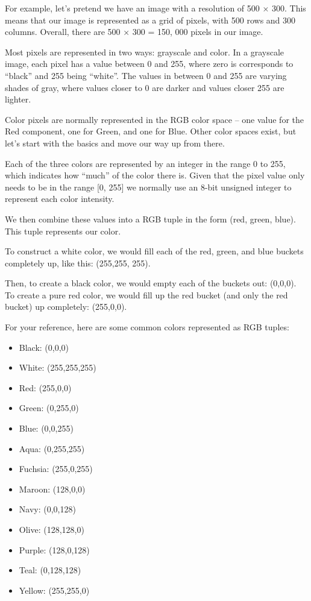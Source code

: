 \documentclass[BTech]{srmuthesis}
\begin{document}
For example, let’s pretend we have an image with a resolution of 500 × 300. This means that our image is represented as a grid of pixels, with 500 rows and 300 columns. Overall, there are 500 × 300 = 150, 000 pixels in our image.

Most pixels are represented in two ways: grayscale and color. In a grayscale image, each pixel has a value between 0 and 255, where zero is corresponds to “black” and 255 being “white”. The values in between 0 and 255 are varying shades of gray, where values closer to 0 are darker and values closer 255 are lighter.

Color pixels are normally represented in the RGB color space – one value for the Red component, one for Green, and one for Blue. Other color spaces exist, but let’s start with the basics and move our way up from there.

Each of the three colors are represented by an integer in the range 0 to 255, which indicates how “much” of the color there is. Given that the pixel value only needs to be in the range [0, 255] we normally use an 8-bit unsigned integer to represent each color intensity.

We then combine these values into a RGB tuple in the form (red, green, blue). This tuple represents our color.

To construct a white color, we would fill each of the red, green, and blue buckets completely up, like this: (255,255, 255).

Then, to create a black color, we would empty each of the buckets out: (0,0,0).
To create a pure red color, we would fill up the red bucket (and only the red bucket) up completely: (255,0,0).

For your reference, here are some common colors represented as RGB tuples:

\begin{itemize}
    \item Black: (0,0,0)
    \item White: (255,255,255)
    \item Red: (255,0,0)
    \item Green: (0,255,0)
    \item Blue: (0,0,255)
    \item Aqua: (0,255,255)
    \item Fuchsia: (255,0,255) 
    \item Maroon: (128,0,0)
    \item Navy: (0,0,128)
    \item Olive: (128,128,0)
    \item Purple: (128,0,128) 
    \item Teal: (0,128,128)
    \item Yellow: (255,255,0)
\end{itemize}
\end{document}
